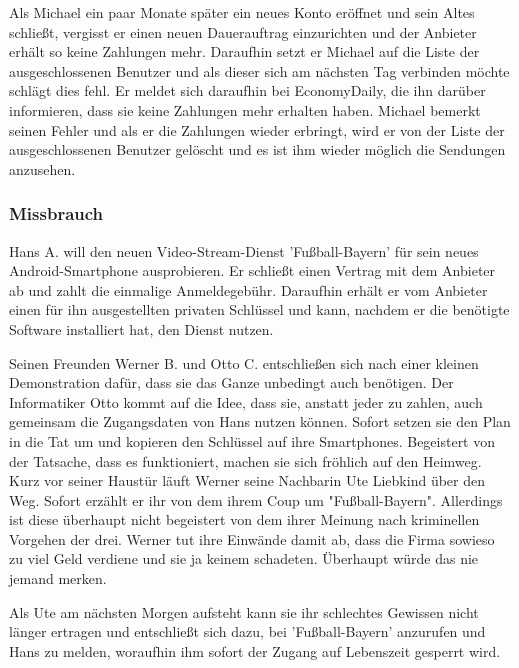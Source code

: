 \documentclass[a4paper,10pt]{scrartcl}
\begin{document}
Als Michael ein paar Monate später ein neues Konto eröffnet und sein Altes schließt, vergisst er einen neuen Dauerauftrag einzurichten und der Anbieter erhält so keine Zahlungen mehr. 
Daraufhin setzt er Michael auf die Liste der ausgeschlossenen Benutzer und als dieser sich am nächsten Tag verbinden möchte schlägt dies fehl. 
Er meldet sich daraufhin bei EconomyDaily, die ihn darüber informieren, dass sie keine Zahlungen mehr erhalten haben. 
Michael bemerkt seinen Fehler und als er die Zahlungen wieder erbringt, wird er von der Liste der ausgeschlossenen Benutzer gelöscht und es ist ihm wieder möglich die Sendungen anzusehen.
\clearpage

\subsubsection{Missbrauch}
Hans A. will den neuen Video-Stream-Dienst 'Fußball-Bayern' für sein neues Android-Smartphone ausprobieren. Er schließt einen Vertrag mit dem Anbieter ab und zahlt die einmalige Anmeldegebühr. Daraufhin erhält er vom Anbieter einen für ihn ausgestellten privaten Schlüssel und kann, nachdem er die benötigte Software installiert hat, den Dienst nutzen.

Seinen Freunden Werner B. und Otto C. entschließen sich nach einer kleinen Demonstration dafür, dass sie das Ganze unbedingt auch benötigen.
Der Informatiker Otto kommt auf die Idee, dass sie, anstatt jeder zu zahlen, auch gemeinsam die Zugangsdaten von Hans nutzen können.
Sofort setzen sie den Plan in die Tat um und kopieren den Schlüssel auf ihre Smartphones. Begeistert von der Tatsache, dass es funktioniert,
machen sie sich fröhlich auf den Heimweg. Kurz vor seiner Haustür läuft Werner seine Nachbarin Ute Liebkind über den Weg. Sofort erzählt
er ihr von dem ihrem Coup um "Fußball-Bayern". Allerdings ist diese überhaupt nicht begeistert von dem ihrer Meinung nach kriminellen
Vorgehen der drei. Werner tut ihre Einwände damit ab, dass die Firma sowieso zu viel Geld verdiene und sie ja keinem schadeten.
Überhaupt würde das nie jemand merken.

Als Ute am nächsten Morgen aufsteht kann sie ihr schlechtes Gewissen nicht länger ertragen und entschließt sich dazu, bei 'Fußball-Bayern' anzurufen und
Hans zu melden, woraufhin ihm sofort der Zugang auf Lebenszeit gesperrt wird.
\end{document}

